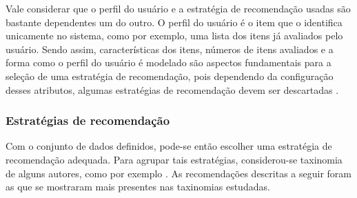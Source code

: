 Vale considerar que o perfil do usuário e a estratégia de recomendação usadas
são bastante dependentes um do outro. O perfil do usuário é o item que o
identifica unicamente no sistema, como por exemplo, uma lista dos itens já
avaliados pelo usuário. Sendo assim, características dos itens, números de itens
avaliados e a forma como o perfil do usuário é modelado são aspectos
fundamentais para a seleção de uma estratégia de recomendação, pois dependendo
da configuração desses atributos, algumas estratégias
de recomendação devem ser descartadas \cite{picault2011get}.

\subsubsection{Estratégias de recomendação}

Com o conjunto de dados definidos, pode-se então escolher uma estratégia de
recomendação adequada. Para agrupar tais estratégias, considerou-se taxinomia de
alguns autores, como por exemplo \cite{burke2007hybrid}. As recomendações
descritas a seguir foram as que se mostraram mais presentes nas taxinomias
estudadas.

